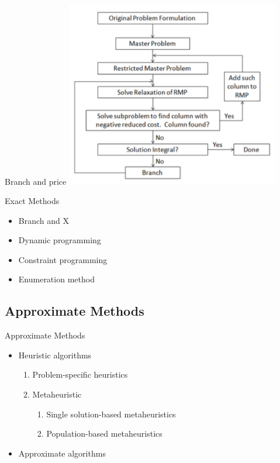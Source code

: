     \begin{frame}{Branch and price}
      \centering
      \includegraphics[width = 0.7\textwidth]{images/branch_price.png}
    \end{frame}

    \begin{frame}{Exact Methods}
      \Large
      \begin{spacing}{1.5}
        \begin{itemize}
          \item Branch and X
          \item<+-> Dynamic programming
          \item<+-> Constraint programming
          \item<+-> Enumeration method
        \end{itemize}
      \end{spacing}
    \end{frame}



    \subsection{Approximate Methods}
    \frame{\sectionpage}

    \begin{frame}{Approximate Methods}
      \Large
      \begin{itemize}
        \item Heuristic algorithms
        \vspace{4pt}
        \begin{enumerate}
          \item<+->  Problem-specific heuristics
          \item<+->  Metaheuristic
            \begin{enumerate}
              \item<+>[*] Single solution-based metaheuristics
              \item<+>[*] Population-based metaheuristics
            \end{enumerate}
          \vspace{4pt}
        \end{enumerate}
        \item<+-> Approximate algorithms
      \end{itemize}
    \end{frame}

